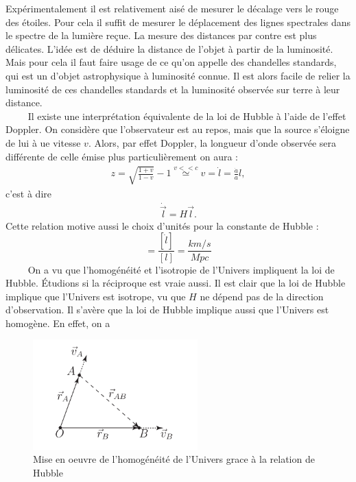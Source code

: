\documentclass[a4paper,12pt]{report}
\theoremstyle{plain}
\theoremstyle{plain}
\begin{document}
      	
      	\qquad Exp\'erimentalement il est relativement ais\'e de mesurer le d\'ecalage vers le rouge des \'etoiles. Pour cela il suffit de mesurer le d\'eplacement des lignes spectrales dans le spectre de la lumi\`ere re\c{c}ue. La mesure des distances par contre est plus d\'elicates. L'id\'ee est de d\'eduire la distance de l'objet \`a partir de la luminosit\'e. Mais pour cela il faut faire usage de ce qu'on appelle des chandelles standards, qui est un d'objet astrophysique \`a luminosit\'e connue. Il est alors facile de relier la luminosit\'e de ces chandelles standards et la luminosit\'e observ\'ee sur terre \`a leur distance.\\
      	
      	$\qquad$ Il existe une interpr\'etation \'equivalente de la loi de Hubble \`a l'aide de l'effet Doppler. On consid\`ere que l'observateur est au repos, mais que la source s'\'eloigne de lui \`a ue vitesse $v$. Alors, par effet Doppler, la longueur d'onde observ\'ee sera diff\'erente de celle \'emise  plus particuli\`erement on aura :
      	\begin{eqnarray}
z=\sqrt{\frac{1+v}{1-v}}-1 \overset{v<<c}{\simeq} v = \dot{l} = \frac{\dot{a}}{a} l, 
\end{eqnarray}
      	c'est \`a dire
     	\begin{eqnarray} 
     	\dot{\overrightarrow{l}} =H \overrightarrow{l}.
     	\end{eqnarray}
      	Cette relation motive aussi le choix d'unit\'es pour la constante de Hubble :
      	\begin{equation}
      	[H]=\frac{[\dot{l}]}{[l]}= \frac{km/s}{Mpc}
      	\end{equation} 
      	$\qquad$ On a vu que l'homog\'en\'eit\'e et l'isotropie de l'Univers impliquent la loi de Hubble. \'{E}tudions si la r\'eciproque est vraie aussi. Il est clair que la loi de Hubble implique que l'Univers est isotrope, vu que $H$ ne d\'epend pas de la direction d'observation. Il s'av\`ere que la loi de Hubble implique aussi que l'Univers est homog\`ene.
      	En effet, on a 
      	
      	     \begin{figure}[h]
\begin{center}
\includegraphics[width=15pc]{t5.png}
\caption{Mise en oeuvre de l'homogénéité de l'Univers grace à la relation de Hubble}
\end{center}
\end{figure}
      	
\end{document}
